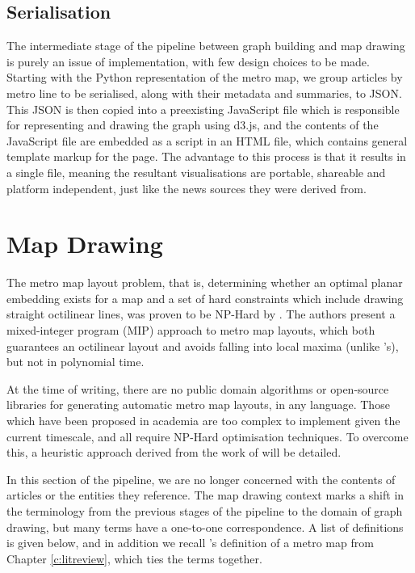\subsection{Serialisation}
The intermediate stage of the pipeline between graph building and map drawing is purely an issue of implementation, with few design choices to be made. Starting with the Python representation of the metro map, we group articles by metro line to be serialised, along with their metadata and summaries, to JSON. This JSON is then copied into a preexisting JavaScript file which is responsible for representing and drawing the graph using d3.js, and the contents of the JavaScript file are embedded as a script in an HTML file, which contains general template markup for the page. The advantage to this process is that it results in a single file, meaning the resultant visualisations are portable, shareable and platform independent, just like the news sources they were derived from.

\clearpage
\section{Map Drawing}

The metro map layout problem, that is, determining whether an optimal planar embedding exists for a map and a set of hard constraints which include drawing straight octilinear lines, was proven to be NP-Hard by \cite{AutomatedDrawingOfMetroMaps}. The authors present a mixed-integer program (MIP) approach to metro map layouts, which both guarantees an octilinear layout and avoids falling into local maxima (unlike \citeauthor{AutomaticMetroMapLayoutThesis}'s), but not in polynomial time.

At the time of writing, there are no public domain algorithms or open-source libraries for generating automatic metro map layouts, in any language. Those which have been proposed in academia \citep{AutomaticMetroMapLayoutThesis, AutomatedDrawingOfMetroMaps} are too complex to implement given the current timescale, and all require NP-Hard optimisation techniques. To overcome this, a heuristic approach derived from the work of \citep{AutomaticMetroMapLayoutThesis, AutomaticMetroMapLayout, WhichAesthetic} will be detailed.

In this section of the pipeline, we are no longer concerned with the contents of articles or the entities they reference. The map drawing context marks a shift in the terminology from the previous stages of the pipeline to the domain of graph drawing, but many terms have a one-to-one correspondence. A list of definitions is given below, and in addition we recall \citeauthor{GeneratingInformationMaps}'s definition of a metro map from Chapter \ref{c:litreview}, which ties the terms together.

